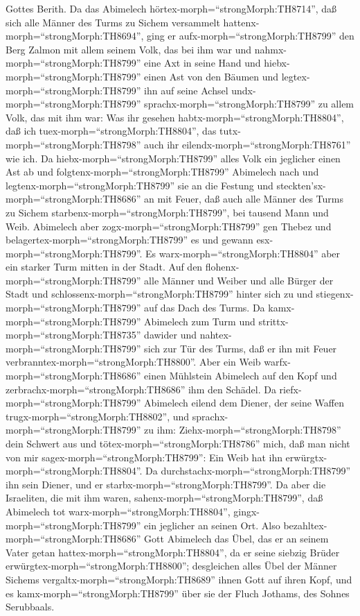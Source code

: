 Gottes Berith.  Da das Abimelech
hörtex-morph=``strongMorph:TH8714'', daß sich alle Männer des Turms zu
Sichem versammelt hattenx-morph=``strongMorph:TH8694'', 
ging er aufx-morph=``strongMorph:TH8799'' den Berg Zalmon mit allem
seinem Volk, das bei ihm war und nahmx-morph=``strongMorph:TH8799'' eine
Axt in seine Hand und hiebx-morph=``strongMorph:TH8799'' einen Ast von
den Bäumen und legtex-morph=``strongMorph:TH8799'' ihn auf seine Achsel
undx-morph=``strongMorph:TH8799'' sprachx-morph=``strongMorph:TH8799''
zu allem Volk, das mit ihm war: Was ihr gesehen
habtx-morph=``strongMorph:TH8804'', daß ich
tuex-morph=``strongMorph:TH8804'', das tutx-morph=``strongMorph:TH8798''
auch ihr eilendx-morph=``strongMorph:TH8761'' wie ich.  Da
hiebx-morph=``strongMorph:TH8799'' alles Volk ein jeglicher einen Ast ab
und folgtenx-morph=``strongMorph:TH8799'' Abimelech nach und
legtenx-morph=``strongMorph:TH8799'' sie an die Festung und
steckten'sx-morph=``strongMorph:TH8686'' an mit Feuer, daß auch alle
Männer des Turms zu Sichem starbenx-morph=``strongMorph:TH8799'', bei
tausend Mann und Weib.  Abimelech aber
zogx-morph=``strongMorph:TH8799'' gen Thebez und
belagertex-morph=``strongMorph:TH8799'' es und gewann
esx-morph=``strongMorph:TH8799''.  Es
warx-morph=``strongMorph:TH8804'' aber ein starker Turm mitten in der
Stadt. Auf den flohenx-morph=``strongMorph:TH8799'' alle Männer und
Weiber und alle Bürger der Stadt und
schlossenx-morph=``strongMorph:TH8799'' hinter sich zu und
stiegenx-morph=``strongMorph:TH8799'' auf das Dach des Turms.
 Da kamx-morph=``strongMorph:TH8799'' Abimelech zum Turm
und strittx-morph=``strongMorph:TH8735'' dawider und
nahtex-morph=``strongMorph:TH8799'' sich zur Tür des Turms, daß er ihn
mit Feuer verbranntex-morph=``strongMorph:TH8800''.  Aber
ein Weib warfx-morph=``strongMorph:TH8686'' einen Mühlstein Abimelech
auf den Kopf und zerbrachx-morph=``strongMorph:TH8686'' ihm den Schädel.
 Da riefx-morph=``strongMorph:TH8799'' Abimelech eilend dem
Diener, der seine Waffen trugx-morph=``strongMorph:TH8802'', und
sprachx-morph=``strongMorph:TH8799'' zu ihm:
Ziehx-morph=``strongMorph:TH8798'' dein Schwert aus und
tötex-morph=``strongMorph:TH8786'' mich, daß man nicht von mir
sagex-morph=``strongMorph:TH8799'': Ein Weib hat ihn
erwürgtx-morph=``strongMorph:TH8804''. Da
durchstachx-morph=``strongMorph:TH8799'' ihn sein Diener, und er
starbx-morph=``strongMorph:TH8799''.  Da aber die
Israeliten, die mit ihm waren, sahenx-morph=``strongMorph:TH8799'', daß
Abimelech tot warx-morph=``strongMorph:TH8804'',
gingx-morph=``strongMorph:TH8799'' ein jeglicher an seinen Ort.
 Also bezahltex-morph=``strongMorph:TH8686'' Gott Abimelech
das Übel, das er an seinem Vater getan
hattex-morph=``strongMorph:TH8804'', da er seine siebzig Brüder
erwürgtex-morph=``strongMorph:TH8800'';  desgleichen alles
Übel der Männer Sichems vergaltx-morph=``strongMorph:TH8689'' ihnen Gott
auf ihren Kopf, und es kamx-morph=``strongMorph:TH8799'' über sie der
Fluch Jothams, des Sohnes Serubbaals.

